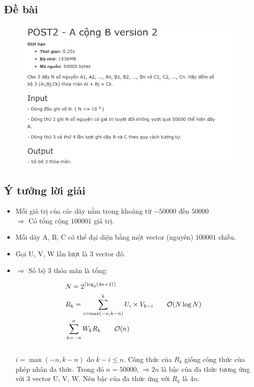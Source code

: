 \documentclass[../report.tex]{subfiles}
\begin{document}
\subsection{Đề bài} \cite{a-plus-b}
\begin{figure}[H]
\centering
\includegraphics[width=\textwidth]{figures/a-plus-b.png}
\end{figure}

\subsection{Ý tưởng lời giải}
\begin{itemize}
    \item Mỗi giá trị của các dãy nằm trong khoảng từ
        $-50000$ đến $50000$ \\
        $\Rightarrow$ Có tổng cộng $100001$ giá trị. 
    \item Mỗi dãy A, B, C có thể đại diện bằng một vector (nguyên)
        $100001$ chiều. 
    \item Gọi U, V, W lần lượt là 3 vector đó.
    \item $\Rightarrow$ Số bộ 3 thỏa mãn là tổng: 

    \begin{align*}
        &N = 2^{\lceil\log_2 (4n + 1)\rceil} \\
        &R_k = \sum_{i = \max(-n, k - n) }^k U_i \times V_{k - i}
        \quad \quad \mathcal{O} (N \log N)\\
        &\sum_{k = -n}^n W_k R_k \quad\quad \mathcal{O}(n) 
    \end{align*}\\

    $i = \max(-n, k - n)$ do $k - i \le n$. 
    Công thức của $R_k$ giống công thức của phép nhân đa thức. 
    Trong đó $n = 50000$, $\Rightarrow 2n$ là bậc của đa thức tương 
    ứng với 3 vector U, V, W. Nên bậc của đa thức ứng với $R_k$ là 
    $4n$. 
\end{itemize}
\end{document}
